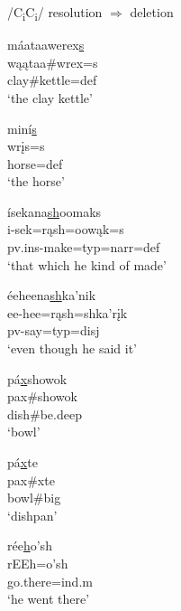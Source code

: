  \newpage
 \begin{exe}

    \item\label{CClenitionexFricatives}  /C\textsubscript{i}C\textsubscript{i}/ resolution $\Rightarrow$ deletion

        \begin{xlist}

	\item\label{CClenitionex4a} \glll máataawerex\uline{s}\\
	wąątaa\#wrex=s\\
	\textnormal{clay}\#\textnormal{kettle}=def\\
	\glt `the clay kettle' \cite[266]{hollow1973b}


	\item\label{CClenitionex4} \glll miní\uline{s}\\
	wrįs=s\\
	\textnormal{horse}=def\\
	\glt `the horse' \citep[251]{hollow1973b}

	\item\label{CClenitionex5a} \glll ísekana\uline{sh}oomaks\\
	i-sek=rąsh=oowąk=s\\
	pv.ins-\textnormal{make}=typ=narr=def\\
	\glt `that which he kind of made' \citep[10]{hollow1973a}

	\item\label{CClenitionex5} \glll éeheena\uline{sh}ka'nik\\
	ee-hee=rąsh=shka'rįk\\
	pv-\textnormal{say}=typ=disj\\
	\glt `even though he said it' \citep[41]{hollow1973a}

	\item\label{CClenitionex6a} \glll pá\uline{x}showok\\
		pax\#showok\\
		\textnormal{dish}\#\textnormal{be.deep}\\
		\glt `bowl' \citep[138]{hollow1970}

	\item\label{CClenitionex6} \glll pá\uline{x}te\\
	pax\#xte\\
	\textnormal{bowl}\#\textnormal{big}\\
	\glt `dishpan' \citep[52]{hollow1973a}

	\item\label{CClenitionex7a} \glll rée\uline{h}o'sh\\
	rEEh=o'sh\\
	\textnormal{go.there}=ind.m\\
	\glt `he went there' \citep[175]{hollow1970}


\end{xlist}
\end{exe}
